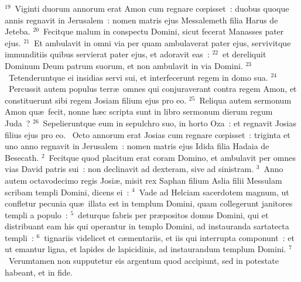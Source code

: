 ${}^{19}$~Viginti duorum annorum erat Amon cum regnare cœpisset~: duobus quoque annis regnavit in Jerusalem~: nomen matris ejus Messalemeth filia Harus de Jeteba.
${}^{20}$~Fecitque malum in conspectu Domini, sicut fecerat Manasses pater ejus.
${}^{21}$~Et ambulavit in omni via per quam ambulaverat pater ejus, servivitque immunditiis quibus servierat pater ejus, et adoravit eas~:
${}^{22}$~et dereliquit Dominum Deum patrum suorum, et non ambulavit in via Domini.
${}^{23}$~Tetenderuntque ei insidias servi sui, et interfecerunt regem in domo sua.
${}^{24}$~Percussit autem populus terr\ae\ omnes qui conjuraverant contra regem Amon, et constituerunt sibi regem Josiam filium ejus pro eo.
${}^{25}$~Reliqua autem sermonum Amon qu\ae\ fecit, nonne h\ae c scripta sunt in libro sermonum dierum regum Juda~?
${}^{26}$~Sepelieruntque eum in sepulchro suo, in horto Oza~: et regnavit Josias filius ejus pro eo.
~\lettrine[lines=10,image=true,loversize=0.05,lraise=-0.03]{O}{}cto annorum erat Josias cum regnare cœpisset~: triginta et uno anno regnavit in Jerusalem~: nomen matris ejus Idida filia Hadaia de Besecath.
${}^{2}$~Fecitque quod placitum erat coram Domino, et ambulavit per omnes vias David patris sui~: non declinavit ad dexteram, sive ad sinistram.
${}^{3}$~Anno autem octavodecimo regis Josi\ae , misit rex Saphan filium Aslia filii Messulam scribam templi Domini, dicens ei~:
${}^{4}$~Vade ad Helciam sacerdotem magnum, ut confletur pecunia qu\ae\ illata est in templum Domini, quam collegerunt janitores templi a populo~:
${}^{5}$~deturque fabris per pr\ae positos domus Domini, qui et distribuant eam his qui operantur in templo Domini, ad instauranda sartatecta templi~:
${}^{6}$~tignariis videlicet et c\ae mentariis, et iis qui interrupta componunt~: et ut emantur ligna, et lapides de lapicidinis, ad instaurandum templum Domini.
${}^{7}$~Verumtamen non supputetur eis argentum quod accipiunt, sed in potestate habeant, et in fide.


